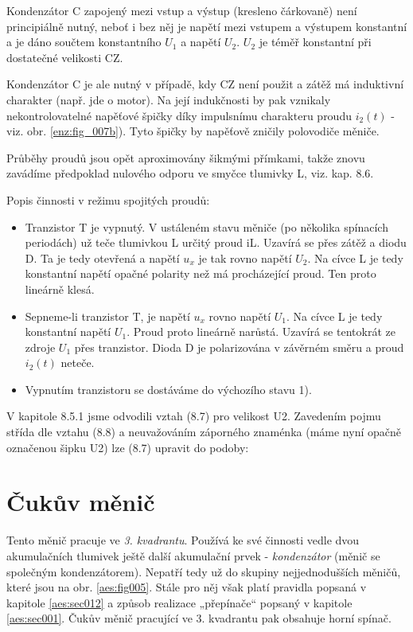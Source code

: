    \begin{note}
      Kondenzátor C zapojený mezi vstup a výstup (kresleno čárkovaně) není principiálně nutný, 
      neboť i bez něj je napětí mezi vstupem a výstupem konstantní a je dáno součtem konstantního 
      \(U_1\) a napětí \(U_2\). \(U_2\) je téměř konstantní při dostatečné velikosti CZ.
      
      Kondenzátor C je ale nutný v případě, kdy CZ není použit a zátěž má induktivní charakter 
      (např. jde o motor). Na její indukčnosti by pak vznikaly nekontrolovatelné napěťové špičky 
      díky impulsnímu charakteru proudu \(i_2(t)\) - viz. obr. \ref{enz:fig_007b}). Tyto špičky by 
      napěťově zničily polovodiče měniče.
    \end{note}
    
    Průběhy proudů jsou opět aproximovány šikmými přímkami, takže znovu zavádíme předpoklad
    nulového odporu ve smyčce tlumivky L, viz. kap. 8.6.
    
    Popis činnosti v režimu spojitých proudů:
    \begin{itemize}
      \item Tranzistor T je vypnutý. V ustáleném stavu měniče (po několika spínacích periodách) už 
            teče tlumivkou L určitý proud iL. Uzavírá se přes zátěž a diodu D. Ta je tedy otevřená 
            a napětí \(u_x\) je tak rovno napětí \(U_2\). Na cívce L je tedy konstantní napětí 
            opačné polarity než má procházející proud. Ten proto lineárně klesá.
      \item Sepneme-li tranzistor T, je napětí \(u_x\) rovno napětí \(U_1\). Na cívce L je tedy 
            konstantní napětí \(U_1\). Proud proto lineárně narůstá. Uzavírá se tentokrát ze zdroje 
            \(U_1\) přes tranzistor. Dioda D je polarizována v závěrném směru a proud \(i_2(t)\) 
            neteče.
      \item Vypnutím tranzistoru se dostáváme do výchozího stavu 1).
    \end{itemize}
    
    V kapitole 8.5.1 jsme odvodili vztah (8.7) pro velikost U2. Zavedením pojmu střída dle vztahu 
    (8.8) a neuvažováním záporného znaménka (máme nyní opačně označenou šipku U2) lze (8.7) upravit 
    do podoby:
    
  \section{Čukův měnič}\label{aes:sec004}
    Tento měnič pracuje ve \emph{3. kvadrantu}. Používá ke své činnosti vedle dvou akumulačních 
    tlumivek ještě další akumulační prvek - \emph{kondenzátor} (měnič se společným kondenzátorem). 
    Nepatří tedy už do skupiny nejjednodušších měničů, které jsou na obr. \ref{aes:fig005}. Stále 
    pro něj však platí pravidla popsaná v kapitole \ref{aes:sec012} a způsob realizace „přepínače“ 
    popsaný v kapitole \ref{aes:sec001}. Čukův měnič pracující ve 3. kvadrantu pak obsahuje horní 
    spínač.
    
